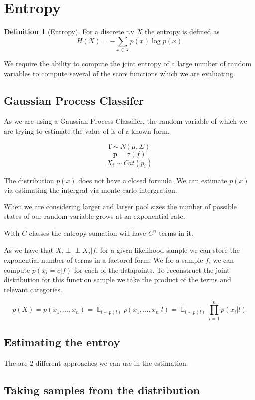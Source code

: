 \documentclass[12pt, a4paper]{report}
\theoremstyle{definition}
\newtheorem{definition}{Definition}[section]
\DeclareMathOperator{\E}{\mathbb{E}}
\begin{document}
\section{Entropy}
\label{sec:Entropy}

\begin{definition}[Entropy]
    For a discrete r.v $X$ the entropy is defined as $$H(X) = - \sum_{x \in X} p(x) \log p(x) $$
\end{definition}


We require the ability to compute the joint entropy of a large number of random variables to compute several of the score functions which we are evaluating.

\subsection{Gaussian Process Classifer}
As we are using a Gaussian Process Classifier, the random variable of which we are trying to estimate the value of is of a known form.


$$ \mathbf{f} \sim N(\mu, \Sigma) $$
$$ \mathbf{p} =  \sigma \left(f \right) $$
$$ X_i \sim Cat(p_i) $$

The distribution $p(x)$ does not have a closed formula. We can estimate $p(x)$ via estimating the intergral via monte carlo intergration.

When we are considering larger and larger pool sizes the number of possible states of our random variable grows at an exponential rate.

With $C$ classes the entropy sumation will have $C^n$ terms in it. 

As we have that $ X_i \perp\!\!\!\perp X_j | f$, for a given likelihood sample we can store the exponential number of terms in a factored form. We for a sample $f$, we can compute $p(x_i = c | f)$ for each of the datapoints. To reconstruct the joint distribution for this function sample we take the product of the terms and relevant categories.


$$ p(X) = p(x_1, \ldots, x_n) = \E_{l \sim p(l)}  p(x_1, \ldots, x_n | l) = \E_{l \sim p(l)} \prod_{i=1}^n  p(x_i| l)$$

\subsection{Estimating the entroy}

The are 2 different approaches we can use in the estimation.

\subsection{Taking samples from the distribution}
\end{document}
